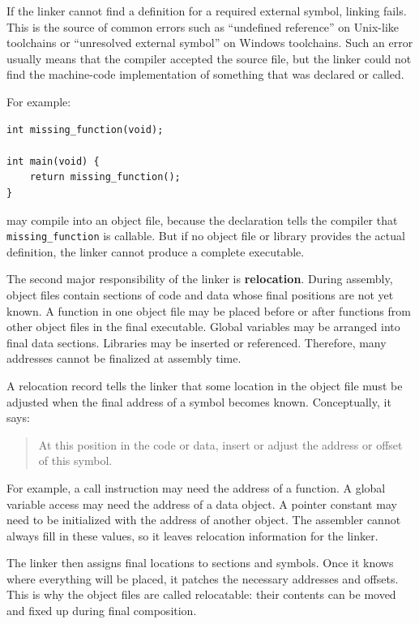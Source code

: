 If the linker cannot find a definition for a required external symbol, linking fails. This is the source of common errors such as ``undefined reference'' on Unix-like toolchains or ``unresolved external symbol'' on Windows toolchains. Such an error usually means that the compiler accepted the source file, but the linker could not find the machine-code implementation of something that was declared or called.

For example:

\begin{verbatim}
int missing_function(void);

int main(void) {
    return missing_function();
}
\end{verbatim}

may compile into an object file, because the declaration tells the compiler that \texttt{missing\_function} is callable. But if no object file or library provides the actual definition, the linker cannot produce a complete executable.

The second major responsibility of the linker is \textbf{relocation}. During assembly, object files contain sections of code and data whose final positions are not yet known. A function in one object file may be placed before or after functions from other object files in the final executable. Global variables may be arranged into final data sections. Libraries may be inserted or referenced. Therefore, many addresses cannot be finalized at assembly time.

A relocation record tells the linker that some location in the object file must be adjusted when the final address of a symbol becomes known. Conceptually, it says:

\begin{quote}
At this position in the code or data, insert or adjust the address or offset of this symbol.
\end{quote}

For example, a call instruction may need the address of a function. A global variable access may need the address of a data object. A pointer constant may need to be initialized with the address of another object. The assembler cannot always fill in these values, so it leaves relocation information for the linker.

The linker then assigns final locations to sections and symbols. Once it knows where everything will be placed, it patches the necessary addresses and offsets. This is why the object files are called relocatable: their contents can be moved and fixed up during final composition.

